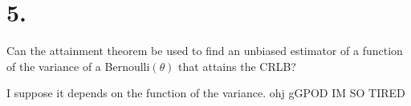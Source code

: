 \section*{5.}

Can the attainment theorem be used to find an unbiased estimator of a function of the variance of a Bernoulli$(\theta)$ that attains the CRLB?

I suppose it depends on the function of the variance. ohj gGPOD IM SO TIRED

